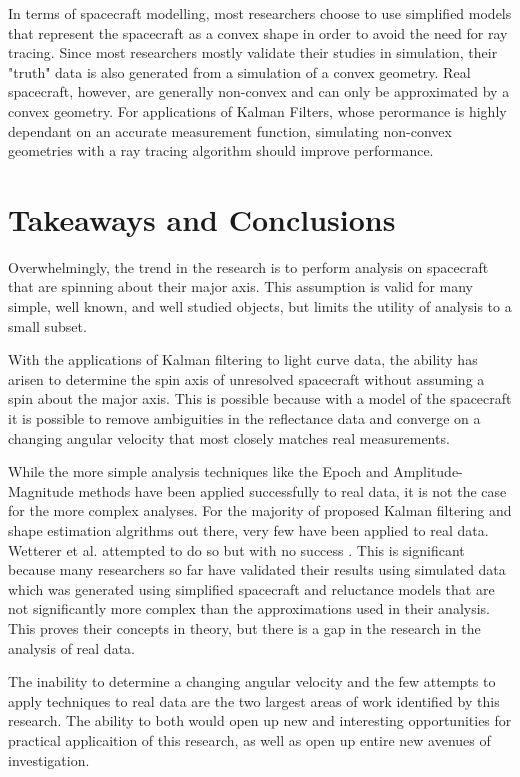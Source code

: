 \documentclass{article}
\begin{document}
In terms of spacecraft modelling, most researchers choose to use simplified models that represent the spacecraft as a convex shape in order to avoid the need for ray tracing. Since most researchers mostly validate their studies in simulation, their "truth" data is also generated from a simulation of a convex geometry. Real spacecraft, however, are generally non-convex and can only be approximated by a convex geometry. For applications of Kalman Filters, whose perormance is highly dependant on an accurate measurement function, simulating non-convex geometries with a ray tracing algorithm should improve performance.


\section{Takeaways and Conclusions}

Overwhelmingly, the trend in the research is to perform analysis on spacecraft that are spinning about their major axis. This assumption is valid for many simple, well known, and well studied objects, but limits the utility of analysis to a small subset.

With the applications of Kalman filtering to light curve data, the ability has arisen to determine the spin axis of unresolved spacecraft without assuming a spin about the major axis. This is possible because with a model of the spacecraft it is possible to remove ambiguities in the reflectance data and converge on a changing angular velocity that most closely matches real measurements.

While the more simple analysis techniques like the Epoch and Amplitude-Magnitude methods have been applied successfully to real data, it is not the case for the more complex analyses. For the majority of proposed Kalman filtering and shape estimation algrithms out there, very few have been applied to real data. Wetterer et al. attempted to do so but with no success \cite{AttitudeEstimationFromLightCurve}. This is significant because many researchers so far have validated their results using simulated data which was generated using simplified spacecraft and reluctance models that are not significantly more complex than the approximations used in their analysis. This proves their concepts in theory, but there is a gap in the research in the analysis of real data.

The inability to determine a changing angular velocity and the few attempts to apply techniques to real data are the two largest areas of work identified by this research. The ability to both would open up new and interesting opportunities for practical applicaition of this research, as well as open up entire new avenues of investigation.






\end{document}
